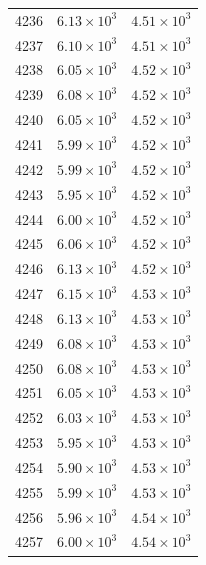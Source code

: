 \begin{table}[H]
\begin{tabular}{lll}
4236 & $\displaystyle 6.13 \times 10^{3}$ & $\displaystyle 4.51 \times 10^{3}$ \\
4237 & $\displaystyle 6.10 \times 10^{3}$ & $\displaystyle 4.51 \times 10^{3}$ \\
4238 & $\displaystyle 6.05 \times 10^{3}$ & $\displaystyle 4.52 \times 10^{3}$ \\
4239 & $\displaystyle 6.08 \times 10^{3}$ & $\displaystyle 4.52 \times 10^{3}$ \\
4240 & $\displaystyle 6.05 \times 10^{3}$ & $\displaystyle 4.52 \times 10^{3}$ \\
4241 & $\displaystyle 5.99 \times 10^{3}$ & $\displaystyle 4.52 \times 10^{3}$ \\
4242 & $\displaystyle 5.99 \times 10^{3}$ & $\displaystyle 4.52 \times 10^{3}$ \\
4243 & $\displaystyle 5.95 \times 10^{3}$ & $\displaystyle 4.52 \times 10^{3}$ \\
4244 & $\displaystyle 6.00 \times 10^{3}$ & $\displaystyle 4.52 \times 10^{3}$ \\
4245 & $\displaystyle 6.06 \times 10^{3}$ & $\displaystyle 4.52 \times 10^{3}$ \\
4246 & $\displaystyle 6.13 \times 10^{3}$ & $\displaystyle 4.52 \times 10^{3}$ \\
4247 & $\displaystyle 6.15 \times 10^{3}$ & $\displaystyle 4.53 \times 10^{3}$ \\
4248 & $\displaystyle 6.13 \times 10^{3}$ & $\displaystyle 4.53 \times 10^{3}$ \\
4249 & $\displaystyle 6.08 \times 10^{3}$ & $\displaystyle 4.53 \times 10^{3}$ \\
4250 & $\displaystyle 6.08 \times 10^{3}$ & $\displaystyle 4.53 \times 10^{3}$ \\
4251 & $\displaystyle 6.05 \times 10^{3}$ & $\displaystyle 4.53 \times 10^{3}$ \\
4252 & $\displaystyle 6.03 \times 10^{3}$ & $\displaystyle 4.53 \times 10^{3}$ \\
4253 & $\displaystyle 5.95 \times 10^{3}$ & $\displaystyle 4.53 \times 10^{3}$ \\
4254 & $\displaystyle 5.90 \times 10^{3}$ & $\displaystyle 4.53 \times 10^{3}$ \\
4255 & $\displaystyle 5.99 \times 10^{3}$ & $\displaystyle 4.53 \times 10^{3}$ \\
4256 & $\displaystyle 5.96 \times 10^{3}$ & $\displaystyle 4.54 \times 10^{3}$ \\
4257 & $\displaystyle 6.00 \times 10^{3}$ & $\displaystyle 4.54 \times 10^{3}$ \\

\end{tabular}
\end{table}

